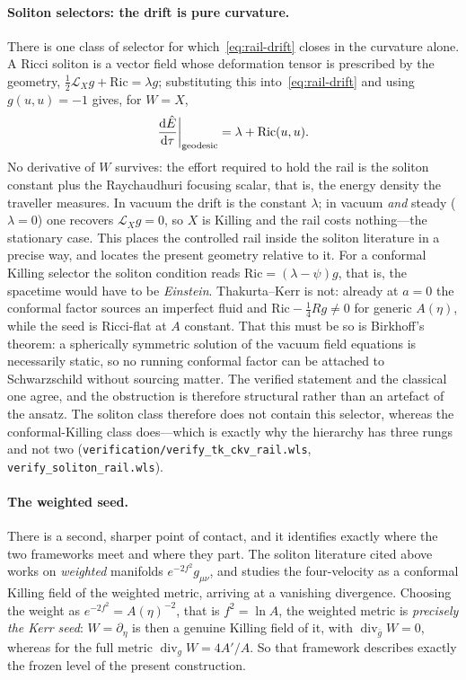 \documentclass[12pt]{iopart}
\theoremstyle{plain}
\theoremstyle{definition}
\theoremstyle{remark}
\newcommand{\Ehat}{\hat E}
\newcommand{\dd}{\mathrm{d}}
\begin{document}
\paragraph{Soliton selectors: the drift is pure curvature.} There is one class of
selector for which~\eqref{eq:rail-drift} closes in the curvature alone. A Ricci
soliton is a vector field whose deformation tensor is prescribed by the geometry,
$\tfrac12\mathcal L_Xg+\mathrm{Ric}=\lambda g$; substituting this
into~\eqref{eq:rail-drift} and using $g(u,u)=-1$ gives, for $W=X$,
\begin{equation}
    \frac{\dd\Ehat}{\dd\tau}\bigg|_{\rm geodesic}
      =\lambda+\mathrm{Ric}(u,u) .
    \label{eq:soliton-drift}
\end{equation}
No derivative of $W$ survives: the effort required to hold the rail is the
soliton constant plus the Raychaudhuri focusing scalar, that is, the energy
density the traveller measures. In vacuum the drift is the constant $\lambda$;
in vacuum \emph{and} steady ($\lambda=0$) one recovers $\mathcal L_Xg=0$, so $X$
is Killing and the rail costs nothing---the stationary case. This places the
controlled rail inside the soliton literature
\cite{Hamilton1986,Lecian2026Yamabe,Lecian2026Solitons} in a precise way, and
locates the present geometry relative to it. For a conformal Killing selector
the soliton condition reads $\mathrm{Ric}=(\lambda-\psi)g$, that is, the
spacetime would have to be \emph{Einstein}. Thakurta--Kerr is not: already at
$a=0$ the conformal factor sources an imperfect fluid and
$\mathrm{Ric}-\tfrac14Rg\neq0$ for generic $A(\eta)$, while the seed is
Ricci-flat at $A$ constant. That this must be so is Birkhoff's theorem: a
spherically symmetric solution of the vacuum field equations is necessarily
static, so no running conformal factor can be attached to Schwarzschild without
sourcing matter. The verified statement and the classical one agree, and the
obstruction is therefore structural rather than an artefact of the ansatz. The soliton class therefore does not contain this
selector, whereas the conformal-Killing class does---which is exactly why the
hierarchy has three rungs and not two
(\texttt{verification/verify\_tk\_ckv\_rail.wls},
\texttt{verify\_soliton\_rail.wls}).

\paragraph{The weighted seed.} There is a second, sharper point of contact, and
it identifies exactly where the two frameworks meet and where they part. The
soliton literature cited above works on \emph{weighted} manifolds
$e^{-2f^2}g_{\mu\nu}$, and studies the four-velocity as a conformal Killing field
of the weighted metric, arriving at a vanishing divergence. Choosing the weight
as $e^{-2f^2}=A(\eta)^{-2}$, that is $f^2=\ln A$, the weighted metric is
\emph{precisely the Kerr seed}: $W=\partial_\eta$ is then a genuine Killing field
of it, with $\operatorname{div}_{\bar g}W=0$, whereas for the full metric
$\operatorname{div}_gW=4A'/A$. So that framework describes exactly the frozen
level of the present construction.
\end{document}

